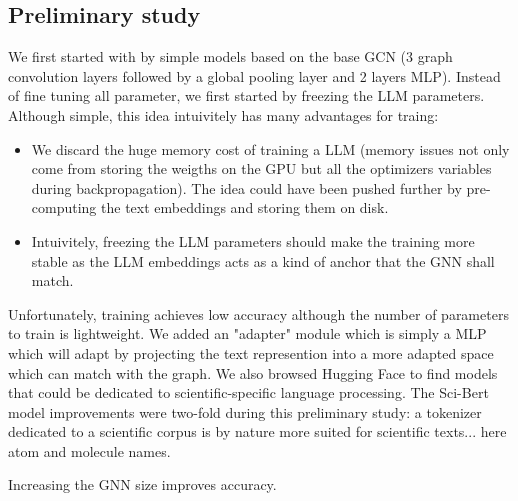 \subsection*{Preliminary study}
\label{sec:preliminary study}
We first started with by simple models based on the base GCN (3 graph convolution layers followed by a global pooling layer and 2 layers MLP). Instead of fine tuning all parameter, we first started by freezing the LLM parameters. Although simple, this idea intuivitely has many advantages for traing:
\begin{itemize}
    \item We discard the huge memory cost of training a LLM (memory issues not only come from storing the weigths on the GPU but all the optimizers variables during backpropagation). The idea could have been pushed further by pre-computing the text embeddings and storing them on disk. 
    \item Intuivitely, freezing the LLM parameters should make the training more stable as the LLM embeddings acts as a kind of anchor that the GNN shall match.
\end{itemize}
Unfortunately, training achieves low accuracy although the number of parameters to train is lightweight. We added an "adapter" module which is simply a MLP which will adapt by projecting the text represention into a more adapted space which can match with the graph.
We also browsed Hugging Face to find models that could be dedicated to scientific-specific language processing. The Sci-Bert\cite{scibert} model improvements were two-fold during this preliminary study: a tokenizer dedicated to a scientific corpus is by nature more suited for scientific texts... here atom and molecule names.

Increasing the GNN size improves accuracy.


